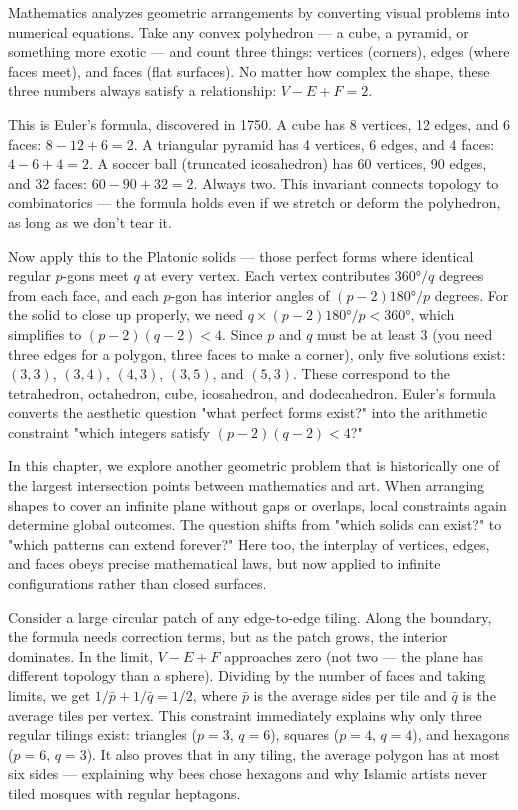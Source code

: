Mathematics analyzes geometric arrangements by converting visual problems into numerical equations. Take any convex polyhedron — a cube, a pyramid, or something more exotic — and count three things: vertices (corners), edges (where faces meet), and faces (flat surfaces). No matter how complex the shape, these three numbers always satisfy a relationship: $V - E + F = 2$.

This is Euler's formula, discovered in 1750. A cube has 8 vertices, 12 edges, and 6 faces: $8 - 12 + 6 = 2$. A triangular pyramid has 4 vertices, 6 edges, and 4 faces: $4 - 6 + 4 = 2$. A soccer ball (truncated icosahedron) has 60 vertices, 90 edges, and 32 faces: $60 - 90 + 32 = 2$. Always two. This invariant connects topology to combinatorics — the formula holds even if we stretch or deform the polyhedron, as long as we don't tear it.

Now apply this to the Platonic solids — those perfect forms where identical regular $p$-gons meet $q$ at every vertex. Each vertex contributes $360°/q$ degrees from each face, and each $p$-gon has interior angles of $(p-2)180°/p$ degrees. For the solid to close up properly, we need $q × (p-2)180°/p < 360°$, which simplifies to $(p-2)(q-2) < 4$. Since $p$ and $q$ must be at least 3 (you need three edges for a polygon, three faces to make a corner), only five solutions exist: $(3,3)$, $(3,4)$, $(4,3)$, $(3,5)$, and $(5,3)$. These correspond to the tetrahedron, octahedron, cube, icosahedron, and dodecahedron. Euler's formula converts the aesthetic question "what perfect forms exist?" into the arithmetic constraint "which integers satisfy $(p-2)(q-2) < 4$?"

In this chapter, we explore another geometric problem that is historically one of the largest intersection points between mathematics and art. When arranging shapes to cover an infinite plane without gaps or overlaps, local constraints again determine global outcomes. The question shifts from "which solids can exist?" to "which patterns can extend forever?" Here too, the interplay of vertices, edges, and faces obeys precise mathematical laws, but now applied to infinite configurations rather than closed surfaces.

Consider a large circular patch of any edge-to-edge tiling. Along the boundary, the formula needs correction terms, but as the patch grows, the interior dominates. In the limit, $V - E + F$ approaches zero (not two — the plane has different topology than a sphere). Dividing by the number of faces and taking limits, we get $1/\bar{p} + 1/\bar{q} = 1/2$, where $\bar{p}$ is the average sides per tile and $\bar{q}$ is the average tiles per vertex. This constraint immediately explains why only three regular tilings exist: triangles ($p=3$, $q=6$), squares ($p=4$, $q=4$), and hexagons ($p=6$, $q=3$). It also proves that in any tiling, the average polygon has at most six sides — explaining why bees chose hexagons and why Islamic artists never tiled mosques with regular heptagons.

